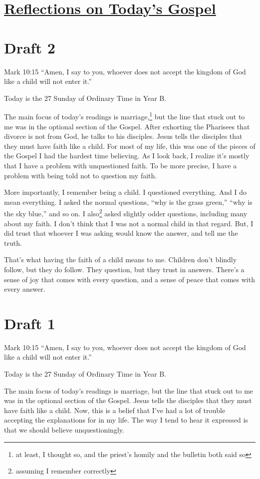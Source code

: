 \documentclass[12pt]{article}[titlepage]
\newcommand{\say}[1]{``#1''}
\newcommand{\1}{\={a}}
\newcommand{\2}{\={e}}
\newcommand{\3}{\={\i}}
\newcommand{\4}{\=o}
\newcommand{\5}{\=u}
\newcommand{\6}{\={A}}
\renewcommand{\,}{\textsuperscript{,}}
\begin{document}
\doublespacing
\section{\href{reflections-on-readings-27-ordinary-b.html}{Reflections on Today's Gospel}}
\section{Draft 2}
Mark 10:15 \say{Amen, I say to you, whoever does not accept the kingdom of God like a child will not enter it.}

Today is the 27 Sunday of Ordinary Time in Year B.

The main focus of today's readings is marriage,\footnote{at least, I thought so, and the priest's homily and the bulletin both said so} but the line that stuck out to me was in the optional section of the Gospel.
After exhorting the Pharisees that divorce is not from God, he talks to his disciples. 
Jesus tells the disciples that they must have faith like a child.
For most of my life, this was one of the pieces of the Gospel I had the hardest time believing.
As I look back, I realize it's mostly that I have a problem with unquestioned faith.
To be more precise, I have a problem with being told not to question my faith.

More importantly, I remember being a child.
I questioned everything.
And I do mean everything.
I asked the normal questions, \say{why is the grass green,} \say{why is the sky blue,} and so on.
I also\footnote{assuming I remember correctly} asked slightly odder questions, including many about my faith.
I don't think that I was not a normal child in that regard.
But, I did trust that whoever I was asking would know the answer, and tell me the truth.

That's what having the faith of a child means to me.
Children don't blindly follow, but they do follow.
They question, but they trust in answers.
There's a sense of joy that comes with every question, and a sense of peace that comes with every answer.

\section{Draft 1}
Mark 10:15 \say{Amen, I say to you, whoever does not accept the kingdom of God like a child will not enter it.}

Today is the 27 Sunday of Ordinary Time in Year B.

The main focus of today's readings is marriage, but the line that stuck out to me was in the optional section of the Gospel.
Jesus tells the disciples that they must have faith like a child.
Now, this is a belief that I've had a lot of trouble accepting the explanations for in my life.
The way I tend to hear it expressed is that we should believe unquestioningly.
\end{document}
